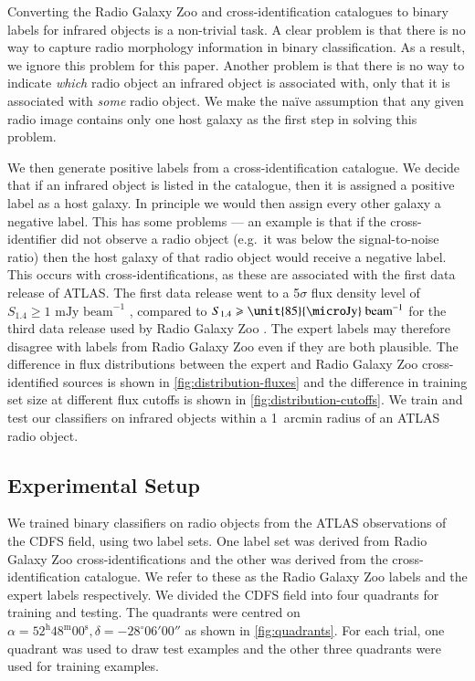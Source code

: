\documentclass[fleqn,usenatbib,usedcolumn]{mnras}
\newcommand{\jansky}{\text{Jy}}
\begin{document}
    Converting the Radio Galaxy Zoo and \citet{norris06} cross-identification
    catalogues to binary labels for infrared objects is a non-trivial task. A
    clear problem is that there is no way to capture radio morphology
    information in binary classification. As a result, we ignore this problem
    for this paper. Another problem is that there is no way to indicate
    \emph{which} radio object an infrared object is associated with, only that
    it is associated with \emph{some} radio object. We make the na\"ive
    assumption that any given radio image contains only one host galaxy as the
    first step in solving this problem.

    We then generate positive labels from a cross-identification catalogue.
    We decide that if an infrared object is listed in the catalogue, then it
    is assigned a positive label as a host galaxy. In principle we would
    then assign every other galaxy a negative label. This has some problems
    --- an example is that if the cross-identifier did not observe a radio
    object (e.g.~it was below the signal-to-noise ratio) then the host galaxy
    of that radio object would receive a negative label. This occurs with
    \citet{norris06} cross-identifications, as these are associated with the
    first data release of ATLAS. The first data release went to a 5$\sigma$
    flux density level of $S_{1.4} \geq 1 \text{ mJy beam}^{-1}$
    \citep{norris06}, compared to $S_{1.4} \geq \unit{85}{\micro\jansky}\text{
    beam}^{-1}$ for the third data release used by Radio Galaxy Zoo
    \citep{franzen15}. The expert labels may therefore disagree with labels
    from Radio Galaxy Zoo even if they are both plausible. The difference in
    flux distributions between the expert and Radio Galaxy Zoo
    cross-identified sources is shown in \autoref{fig:distribution-fluxes} and
    the difference in training set size at different flux cutoffs is shown in
    \autoref{fig:distribution-cutoffs}. We train and test our classifiers on
    infrared objects within a 1~arcmin radius of an ATLAS radio object.

  \subsection{Experimental Setup}
  \label{sec:experimental-setup}

    We trained binary classifiers on radio objects from the ATLAS observations
    of the CDFS field, using two label sets. One label set was derived from
    Radio Galaxy Zoo cross-identifications and the other was derived from the
    \citet{norris06} cross-identification catalogue. We refer to these as the
    Radio Galaxy Zoo labels and the expert labels respectively. We divided the
    CDFS field into four quadrants for training and testing. The quadrants
    were centred on $\alpha = 52^\text{h}48^\text{m}00^\text{s},
    \delta = -28^\circ{}06'00''$ as shown in \autoref{fig:quadrants}. For
    each trial, one quadrant was used to draw test examples and the other three
    quadrants were used for training examples.
\end{document}
